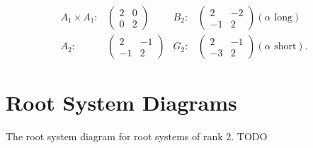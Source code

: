 \begin{align*}
	A_1\times A_1:&\left(\begin{array}{rr}2 & 0\\0 & 2\end{array}\right) &B_2:&\left(\begin{array}{rr}2 & -2\\-1 & 2\end{array}\right) (\alpha \textrm{ long}) \\
	A_2:&\left(\begin{array}{rr}2 & -1\\-1 & 2\end{array}\right) &G_2:&\left(\begin{array}{rr}2 & -1\\-3 & 2\end{array}\right) (\alpha \textrm{ short}).
\end{align*}

\section{Root System Diagrams}

The root system diagram for root systems of rank 2.
TODO

